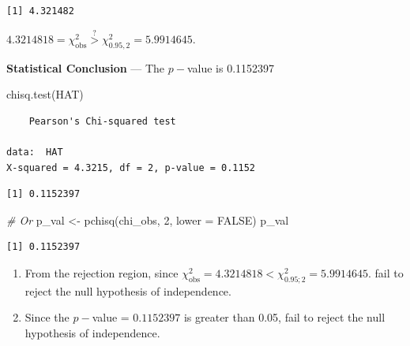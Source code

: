 \documentclass[
]{article}
\newenvironment{Shaded}{\begin{snugshade}}{\end{snugshade}}
\newcommand{\AttributeTok}[1]{\textcolor[rgb]{0.77,0.63,0.00}{#1}}
\newcommand{\CommentTok}[1]{\textcolor[rgb]{0.56,0.35,0.01}{\textit{#1}}}
\newcommand{\ConstantTok}[1]{\textcolor[rgb]{0.00,0.00,0.00}{#1}}
\newcommand{\DecValTok}[1]{\textcolor[rgb]{0.00,0.00,0.81}{#1}}
\newcommand{\FunctionTok}[1]{\textcolor[rgb]{0.00,0.00,0.00}{#1}}
\newcommand{\NormalTok}[1]{#1}
\newcommand{\OtherTok}[1]{\textcolor[rgb]{0.56,0.35,0.01}{#1}}
\newcommand{\SpecialCharTok}[1]{\textcolor[rgb]{0.00,0.00,0.00}{#1}}
\begin{document}
\begin{verbatim}
[1] 4.321482
\end{verbatim}

\(4.3214818 = \chi^2_{\text{obs}} \overset{?}{>} \chi^2_{0.95,2}= 5.9914645\).

\textbf{Statistical Conclusion} --- The \(p-\)value is 0.1152397

\begin{Shaded}
\begin{Highlighting}[]
\FunctionTok{chisq.test}\NormalTok{(HAT)}
\end{Highlighting}
\end{Shaded}

\begin{verbatim}
    Pearson's Chi-squared test

data:  HAT
X-squared = 4.3215, df = 2, p-value = 0.1152
\end{verbatim}

\begin{Shaded}
\end{Shaded}

\begin{verbatim}
[1] 0.1152397
\end{verbatim}

\begin{Shaded}
\begin{Highlighting}[]
\CommentTok{\# Or}
\NormalTok{p\_val }\OtherTok{\textless{}{-}} \FunctionTok{pchisq}\NormalTok{(chi\_obs, }\DecValTok{2}\NormalTok{, }\AttributeTok{lower =} \ConstantTok{FALSE}\NormalTok{)}
\NormalTok{p\_val}
\end{Highlighting}
\end{Shaded}

\begin{verbatim}
[1] 0.1152397
\end{verbatim}

\begin{enumerate}
\def\labelenumi{\Roman{enumi}.}
\item
  From the rejection region, since \(\chi_{\text{obs}}^2=4.3214818 < \chi^2_{0.95;2}=5.9914645\). fail to reject the null hypothesis of independence.
\item
  Since the \(p-\)value = \(0.1152397\) is greater than 0.05, fail to reject the null hypothesis of independence.
\end{enumerate}
\end{document}
